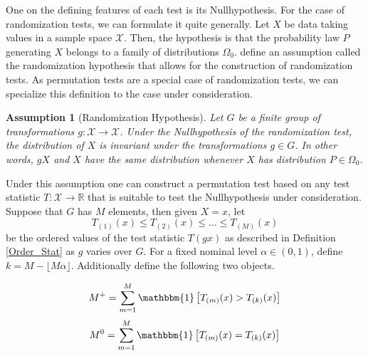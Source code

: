\documentclass[12pt, a4paper]{article}
\theoremstyle{MAstyle} \newtheorem{assumption}{Assumption}[section]
\theoremstyle{MAstyle} \newtheorem{definition}{Definition}[section]
\theoremstyle{MAstyle} \newtheorem{theorem}{Theorem}[section]
\begin{document}
			One on the defining features of each test is its Nullhypothesis. For the case of randomization tests, we can formulate it quite generally. Let $X$ be data taking values in a sample space $\mathcal{X}$. Then, the hypothesis is that the probability law $P$ generating $X$ belongs to a family of distributions $\Omega_0$. \cite{lehmann_testing_2005} define an assumption called the randomization hypothesis that allows for the construction of randomization tests. As permutation tests are a special case of randomization tests, we can specialize this definition to the case under consideration.
			\begin{assumption}[Randomization Hypothesis]\label{rand_hypo}
				 Let $G$ be a finite group of transformations $g: \mathcal{X} \rightarrow \mathcal{X}$. Under the Nullhypothesis of the randomization test, the distribution of $X$ is invariant under the transformations $g \in G$. In other words, $gX$ and $X$ have the same distribution whenever $X$ has distribution $P \in \Omega_0$.
			\end{assumption}
			Under this assumption one can construct a permutation test based on any test statistic $T:\mathcal{X} \rightarrow \mathbb{R}$ that is suitable to test the Nullhypothesis under consideration. Suppose that $G$ has $M$ elements, then given $X = x$, let 
			$$T_{(1)}(x) \leq T_{(2)}(x) \leq \dots \leq T_{(M)}(x) $$
			be the ordered values of the test statistic $T(gx)$ as described in Definition \ref{Order_Stat} as $g$ varies over $G$. For a fixed nominal level $\alpha \in (0,1)$, define $k = M - \lfloor M\alpha \rfloor$. Additionally define the following two objects.
			\begin{multicols}{2}
				\noindent
				\begin{equation*}
					M^{+} = \sum_{m = 1}^{M}\mathbbm{1}\left[T_{(m)}(x) > T_{(k)}(x)\right]
				\end{equation*}
				\begin{equation}
					M^{0} = \sum_{m = 1}^{M}\mathbbm{1}\left[T_{(m)}(x) = T_{(k)}(x)\right]
				\end{equation}
			\end{multicols}
			
\end{document}
